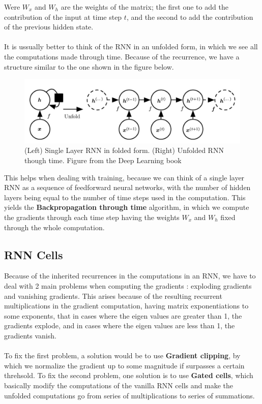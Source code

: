 \documentclass{llncs}
\begin{document}
Were $W_{x}$ and $W_{h}$ are the weights of the matrix; the first one to add the contribution of the input at time step $t$, and the second to add the contribution of the previous hidden state.
\\
\\
It is ussually better to think of the RNN in an unfolded form, in which we see all the computations made through time. Because of the recurrence, we have a structure similar to the one shown in the figure below.

\begin{figure}[H]
    \centering
    \includegraphics[scale=0.4]{../_img/img_dlb_rnnUnfolded.jpg}
    \caption{(Left) Single Layer RNN in folded form. (Right) Unfolded RNN though time. Figure from the Deep Learning book \cite{deeplearningbook}}
    \label{fig:img_dlb_rnnUnfolded}
\end{figure}

This helps when dealing with training, because we can think of a single layer RNN as a sequence of feedforward neural networks, with the number of hidden layers being equal to the number of time steps used in the computation. This yields the \textbf{ Backpropagation through time } algorithm, in which we compute the gradients through each time step having the weights $W_{x}$ and $W_{h}$ fixed through the whole computation.

\subsection{RNN Cells}

Because of the inherited recurrences in the computations in an RNN, we have to deal with 2 main problems when computing the gradients : exploding gradients and vanishing gradients. This arises because of the resulting recurrent multiplications in the gradient computation, having matrix exponentiations to some exponents, that in cases where the eigen values are greater than 1, the gradients explode, and in cases where the eigen values are less than 1, the gradients vanish.
\\
\\
To fix the first problem, a solution would be to use \textbf{Gradient clipping}, by which we normalize the gradient up to some magnitude if surpasses a certain threhsold. To fix the second problem, one solution is to use \textbf{Gated cells}, which basically modify the computations of the vanilla RNN cells and make the unfolded computations go from series of multiplications to series of summations.
\end{document}
